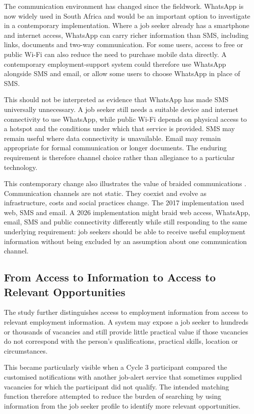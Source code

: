 The communication environment has changed since the fieldwork. WhatsApp is now widely used in South Africa and would be an important option to investigate in a contemporary implementation. Where a job seeker already has a smartphone and internet access, WhatsApp can carry richer information than SMS, including links, documents and two-way communication. For some users, access to free or public Wi-Fi can also reduce the need to purchase mobile data directly. A contemporary employment-support system could therefore use WhatsApp alongside SMS and email, or allow some users to choose WhatsApp in place of SMS.

This should not be interpreted as evidence that WhatsApp has made SMS universally unnecessary. A job seeker still needs a suitable device and internet connectivity to use WhatsApp, while public Wi-Fi depends on physical access to a hotspot and the conditions under which that service is provided. SMS may remain useful where data connectivity is unavailable. Email may remain appropriate for formal communication or longer documents. The enduring requirement is therefore channel choice rather than allegiance to a particular technology.

This contemporary change also illustrates the value of braided communications \cite{densmore2013}. Communication channels are not static. They coexist and evolve as infrastructure, costs and social practices change. The 2017 implementation used web, SMS and email. A 2026 implementation might braid web access, WhatsApp, email, SMS and public connectivity differently while still responding to the same underlying requirement: job seekers should be able to receive useful employment information without being excluded by an assumption about one communication channel.


\subsection{From Access to Information to Access to Relevant Opportunities}

The study further distinguishes access to employment information from access to relevant employment information. A system may expose a job seeker to hundreds or thousands of vacancies and still provide little practical value if those vacancies do not correspond with the person's qualifications, practical skills, location or circumstances.

This became particularly visible when a Cycle 3 participant compared the customised notifications with another job-alert service that sometimes supplied vacancies for which the participant did not qualify. The intended matching function therefore attempted to reduce the burden of searching by using information from the job seeker profile to identify more relevant opportunities.

